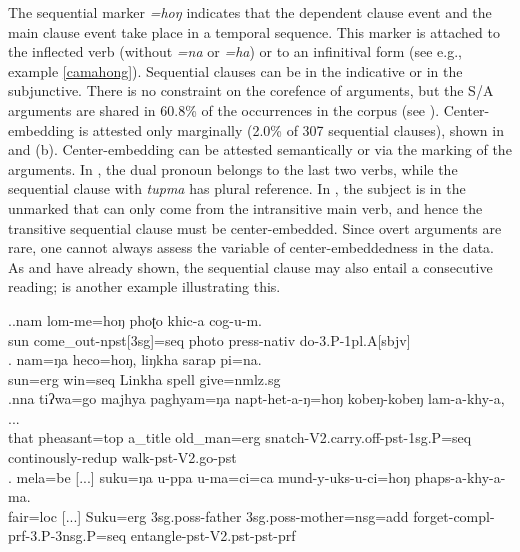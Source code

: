 The sequential marker \emph{=hoŋ}  indicates that the dependent clause event and the main clause event take place in a temporal sequence.  This  marker is attached to the  inflected verb (without \emph{=na} or \emph{=ha}) or to an infinitival form (see e.g., example \ref{camahong}). Sequential clauses can be in the indicative or in the subjunctive. There is no constraint on the corefence of arguments, but the S/A arguments are shared in 60.8\% of the occurrences in the corpus (see \Next). Center-embedding is attested only marginally (2.0\% of 307 sequential clauses), shown in \NNext[a] and (b). Center-embedding can be attested semantically or via the  marking of the arguments. In \NNext[a], the dual pronoun belongs to the last two verbs, while the sequential clause with \emph{tupma}  has plural reference. In \NNext[b], the subject is in the unmarked  that can only come from the intransitive main verb, and hence the transitive sequential clause must be center-embedded. Since overt arguments are rare, one cannot always assess the variable of center-embeddedness in the data. As \Next[b] and \NNext[b] have already shown, the sequential clause may also entail a consecutive reading; \NNext[c] is another example illustrating this.
	
	\ex.\ag.nam lom-me=hoŋ phoʈo khic-a cog-u-m.\\
	sun come\_out{\sc -npst[3sg]=seq} photo press{\sc -nativ} do{\sc -3.P-1pl.A[sbjv]}\\
	\bg.         nam=ŋa   heco=hoŋ,                        liŋkha   sarap pi=na.\\
	sun{\sc =erg} win{\sc [pst;3.P]=seq} Linkha spell give{\sc [pst;3.P]=nmlz.sg}\\
	 
	\bg.nna  tiʔwa=go       majhya                 paghyam=ŋa   napt-het-a-ŋ=hoŋ                         kobeŋ-kobeŋ       lam-a-khy-a, ...\\
	that pheasant{\sc =top} a\_title  old\_man{\sc =erg} snatch{\sc -V2.carry.off-pst-1sg.P=seq} continously-{\sc redup} walk{\sc [3sg]-pst-V2.go-pst}\\
	 
\bg.   mela=be [...] suku=ŋa     u-ppa             u-ma=ci=ca                        mund-y-uks-u-ci=hoŋ                           phaps-a-khy-a-ma.\\
fair{\sc =loc} [...] Suku{\sc =erg} {\sc 3sg.poss-}father {\sc 3sg.poss-}mother{\sc =nsg=add} forget{\sc -compl-prf-3.P-3nsg.P=seq} entangle{\sc [3sg]-pst-V2.pst-pst-prf}\\
 



